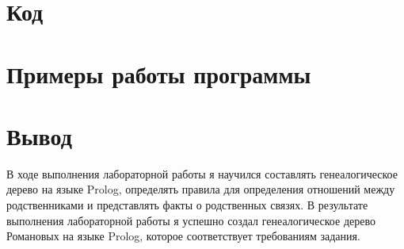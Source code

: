 \documentclass[12pt,onecolumn]{article}
\begin{document}
\section{Код}


\section{Примеры работы программы}

\section{Вывод}
В ходе выполнения лабораторной работы я научился составлять генеалогическое дерево
 на языке Prolog, определять правила для определения отношений между
  родственниками и представлять факты о родственных связях. 
  В результате выполнения лабораторной работы я успешно создал генеалогическое дерево Романовых на языке Prolog, которое соответствует требованиям задания.
\end{document}
